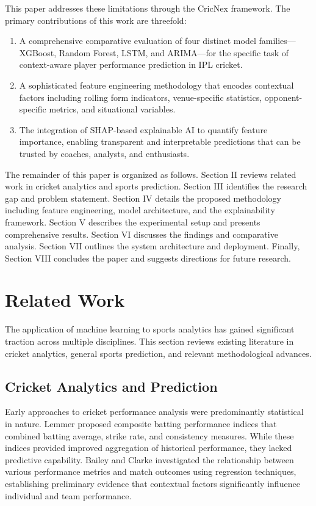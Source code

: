 \documentclass[conference]{IEEEtran}
\begin{document}
This paper addresses these limitations through the CricNex framework. The primary contributions of this work are threefold:
\begin{enumerate}
    \item A comprehensive comparative evaluation of four distinct model families—XGBoost, Random Forest, LSTM, and ARIMA—for the specific task of context-aware player performance prediction in IPL cricket.
    \item A sophisticated feature engineering methodology that encodes contextual factors including rolling form indicators, venue-specific statistics, opponent-specific metrics, and situational variables.
    \item The integration of SHAP-based explainable AI to quantify feature importance, enabling transparent and interpretable predictions that can be trusted by coaches, analysts, and enthusiasts.
\end{enumerate}

The remainder of this paper is organized as follows. Section II reviews related work in cricket analytics and sports prediction. Section III identifies the research gap and problem statement. Section IV details the proposed methodology including feature engineering, model architecture, and the explainability framework. Section V describes the experimental setup and presents comprehensive results. Section VI discusses the findings and comparative analysis. Section VII outlines the system architecture and deployment. Finally, Section VIII concludes the paper and suggests directions for future research.

\section{Related Work}
The application of machine learning to sports analytics has gained significant traction across multiple disciplines. This section reviews existing literature in cricket analytics, general sports prediction, and relevant methodological advances.

\subsection{Cricket Analytics and Prediction}
Early approaches to cricket performance analysis were predominantly statistical in nature. Lemmer \cite{ref1} proposed composite batting performance indices that combined batting average, strike rate, and consistency measures. While these indices provided improved aggregation of historical performance, they lacked predictive capability. Bailey and Clarke \cite{ref2} investigated the relationship between various performance metrics and match outcomes using regression techniques, establishing preliminary evidence that contextual factors significantly influence individual and team performance.
\end{document}
